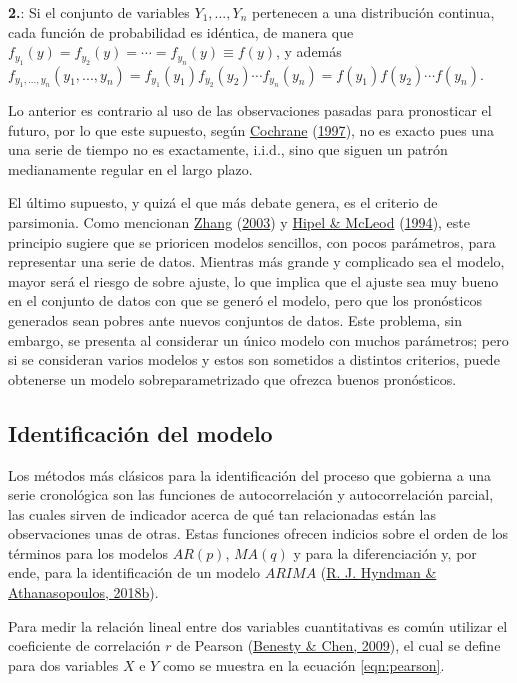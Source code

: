 \documentclass[
]{article}
\begin{document}
\textbf{2.}: Si el conjunto de variables \(Y_1,...,Y_n\) pertenecen a
una distribución continua, cada función de probabilidad es idéntica, de
manera que \(f_{y_1}(y)=f_{y_2}(y)=\cdots=f_{y_n}(y)\equiv f(y)\), y
además
\(f_{y_1,...,y_n}(y_1,...,y_n)=f_{y_1}(y_1)f_{y_2}(y_2)\cdots f_{y_n}(y_n)=f(y_1)f(y_2)\cdots f(y_n)\).

Lo anterior es contrario al uso de las observaciones pasadas para
pronosticar el futuro, por lo que este supuesto, según
\protect\hyperlink{ref-Cochrane}{Cochrane}
(\protect\hyperlink{ref-Cochrane}{1997}), no es exacto pues una una
serie de tiempo no es exactamente, i.i.d., sino que siguen un patrón
medianamente regular en el largo plazo.

El último supuesto, y quizá el que más debate genera, es el criterio de
parsimonia. Como mencionan \protect\hyperlink{ref-Zhang}{Zhang}
(\protect\hyperlink{ref-Zhang}{2003}) y
\protect\hyperlink{ref-Hipel}{Hipel \& McLeod}
(\protect\hyperlink{ref-Hipel}{1994}), este principio sugiere que se
prioricen modelos sencillos, con pocos parámetros, para representar una
serie de datos. Mientras más grande y complicado sea el modelo, mayor
será el riesgo de sobre ajuste, lo que implica que el ajuste sea muy
bueno en el conjunto de datos con que se generó el modelo, pero que los
pronósticos generados sean pobres ante nuevos conjuntos de datos. Este
problema, sin embargo, se presenta al considerar un único modelo con
muchos parámetros; pero si se consideran varios modelos y estos son
sometidos a distintos criterios, puede obtenerse un modelo
sobreparametrizado que ofrezca buenos pronósticos.

\subsection{Identificación del modelo}

Los métodos más clásicos para la identificación del proceso que gobierna
a una serie cronológica son las funciones de autocorrelación y
autocorrelación parcial, las cuales sirven de indicador acerca de qué
tan relacionadas están las observaciones unas de otras. Estas funciones
ofrecen indicios sobre el orden de los términos para los modelos
\(AR(p)\), \(MA(q)\) y para la diferenciación y, por ende, para la
identificación de un modelo \(ARIMA\)
(\protect\hyperlink{ref-hyndman_box-jenkins}{R. J. Hyndman \&
Athanasopoulos, 2018b}).

Para medir la relación lineal entre dos variables cuantitativas es común
utilizar el coeficiente de correlación \(r\) de Pearson
(\protect\hyperlink{ref-pearson}{Benesty \& Chen, 2009}), el cual se
define para dos variables \(X\) e \(Y\) como se muestra en la ecuación
\ref{eqn:pearson}.
\end{document}

